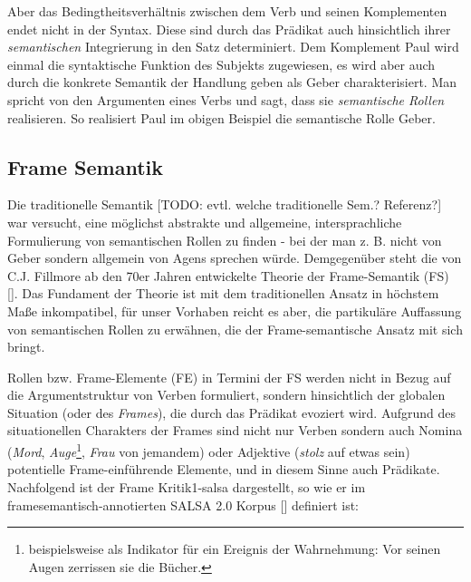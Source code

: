 \documentclass[12pt]{article}
\begin{document}
Aber das Bedingtheitsverhältnis zwischen dem Verb und seinen Komplementen 
endet nicht in der Syntax. Diese sind durch das Prädikat auch hinsichtlich ihrer 
\textit{semantischen} Integrierung in den Satz determiniert. Dem Komplement \glqq{}Paul\grqq{}
wird einmal die syntaktische Funktion des Subjekts zugewiesen, es wird aber auch
durch die konkrete Semantik der Handlung \glqq{}geben\grqq{} als 
\glqq{}Geber\grqq{} charakterisiert. Man spricht von den Argumenten
eines Verbs und sagt, dass sie \textit{semantische Rollen} realisieren. So realisiert \glqq{}Paul\grqq{} im obigen Beispiel die semantische Rolle \glqq{}Geber\grqq{}.

\subsection{Frame Semantik}

Die traditionelle Semantik [TODO: evtl. welche traditionelle Sem.? Referenz?] war versucht, eine möglichst abstrakte und
allgemeine, intersprachliche Formulierung von semantischen Rollen zu
finden - bei der man z. B. nicht von \glqq{}Geber\grqq{} sondern allgemein
von \glqq{}Agens\grqq{} sprechen würde. Demgegenüber steht die von C.J. Fillmore
ab den 70er Jahren entwickelte Theorie der Frame-Semantik (FS)
[\cite{fillmore1985}]. Das Fundament der Theorie ist mit dem traditionellen
Ansatz in höchstem Maße inkompatibel, für unser Vorhaben reicht es aber, die
partikuläre Auffassung von semantischen Rollen zu erwähnen, die der
Frame-semantische Ansatz mit sich bringt.

Rollen bzw. Frame-Elemente (FE) in Termini der FS werden nicht in Bezug auf die
Argumentstruktur von Verben formuliert, sondern hinsichtlich der globalen
Situation (oder des \textit{Frames}), die durch das Prädikat evoziert wird. Aufgrund
des situationellen Charakters der Frames sind nicht nur Verben sondern auch
Nomina (\textit{Mord}, \textit{Auge}\footnote{beispielsweise als Indikator für ein Ereignis der Wahrnehmung: \glqq{}Vor seinen Augen zerrissen sie die Bücher.\grqq{}}, \textit{Frau} von jemandem) oder Adjektive (\textit{stolz} auf etwas sein) potentielle
Frame-einführende Elemente, und in diesem Sinne auch Prädikate. Nachfolgend ist der Frame \glqq{}Kritik1-salsa\grqq{} dargestellt, so wie er im framesemantisch-annotierten SALSA 2.0 Korpus [\cite{rehbein_adding_2012}] definiert ist:
\end{document}
